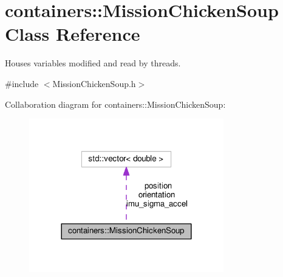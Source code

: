 \hypertarget{classcontainers_1_1MissionChickenSoup}{}\section{containers\+:\+:Mission\+Chicken\+Soup Class Reference}
\label{classcontainers_1_1MissionChickenSoup}


Houses variables modified and read by threads.  




{\ttfamily \#include $<$Mission\+Chicken\+Soup.\+h$>$}



Collaboration diagram for containers\+:\+:Mission\+Chicken\+Soup\+:\nopagebreak
\begin{figure}[H]
\begin{center}
\leavevmode
\includegraphics[width=240pt]{dc/dc9/classcontainers_1_1MissionChickenSoup__coll__graph}
\end{center}
\end{figure}
